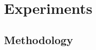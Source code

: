 \documentclass[12pt,mscres,cdtppar,twoside,openright,logo,rightchapter,normalheadings]{infthesis}
\theoremstyle{definition}
\begin{document}



\chapter{Experiments}
\label{ch:experiments}

\section{Methodology}
\label{sec:methodology}

\end{document}
